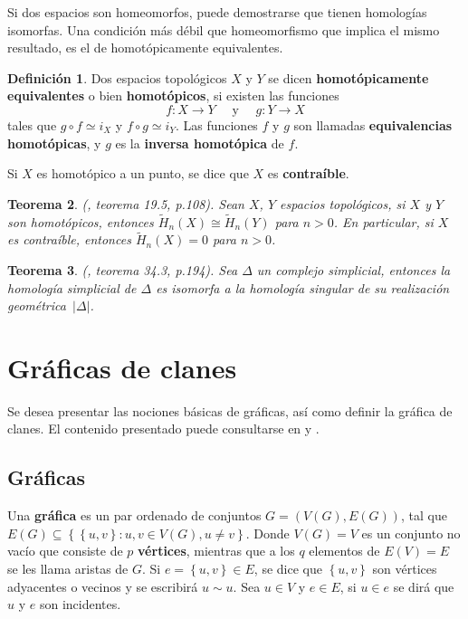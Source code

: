 \documentclass[12pt]{book}
\newtheorem{theorem}{Teorema}[section]
\theoremstyle{definition}
\newtheorem{definition}[theorem]{Definición}
\newcounter{in}
\newcounter{ini}
\begin{document}
Si dos espacios son homeomorfos, puede demostrarse que tienen
homologías isomorfas. Una condición más débil que homeomorfismo que
implica el mismo resultado, es el de homotópicamente equivalentes.
 
\begin{definition}
  Dos espacios topológicos $X$ y $Y$ se dicen \textbf{homotópicamente
    equivalentes} o bien \textbf{homotópicos}, si existen las funciones
  $$f:X\rightarrow Y \quad \mbox{ y }\quad g:Y\rightarrow X$$
  tales que $g\circ f\simeq i_{X}$ y $f\circ g\simeq i_{Y}$. Las
  funciones $f$ y $g$ son llamadas\textbf{ equivalencias homotópicas},
  y $g$ es la \textbf{inversa homotópica} de $f$. 
\end{definition}
Si $X$ es homotópico a un punto, se dice que $X$ es
\textbf{contraíble}.

\begin{theorem}{\normalfont(\cite{munkres1984elements}, teorema 19.5,
    p.108)}.  Sean $X$, $Y$ espacios topológicos, si $X$ y $Y$ son
  homotópicos, entonces $\widetilde H_{n}(X)\cong \widetilde H_{n}(Y)$
  para $n>0$. En particular, si $X$ es contraíble, entonces
  $\widetilde H_{n}(X)=0$ para $n>0$.
  \label{esp-homotopicos-homologias-iso}
\end{theorem}

\begin{theorem}{\normalfont(\cite{munkres1984elements}, teorema 34.3, p.194)}.
  Sea $\Delta$ un complejo simplicial, entonces la homología
  simplicial de $\Delta$ es isomorfa a la homología singular de su
  realización geométrica~$|\Delta|$.
  \label{homologia-realizacion}
\end{theorem}
 

\chapter{Gráficas de clanes}
\label{cha:Graficas_clanes}

Se desea presentar las nociones básicas de gráficas, así como definir
la gráfica de clanes. El contenido presentado puede consultarse en
\cite{harary} y \cite{larrion2008equivariant}.

\section{Gráficas}
\label{sec:graficas}

Una \textbf{gráfica} es un par ordenado de conjuntos
$G = (V(G), E(G))$, tal que
$E(G) \subseteq \left\{ \left\{ u,v \right\} \colon u,v \in V(G), u
  \neq v \right\}$. Donde $V(G) = V$ es un conjunto no vacío que
consiste de $p$ \textbf{vértices}, mientras que a los $q$ elementos de
$E(V) = E$ se les llama aristas de $G$. Si
$e = \left\{ u,v \right\} \in E$, se dice que $\left\{ u,v \right\}$
son vértices adyacentes o vecinos y se escribirá $u \sim u$.  Sea
$u \in V$ y $e \in E$, si $u \in e$ se dirá que $u$ y $e$ son
incidentes.
\end{document}
